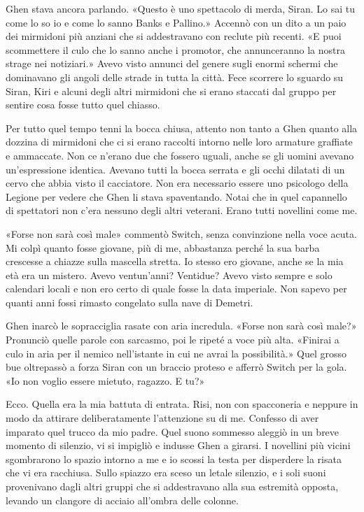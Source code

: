 Ghen stava ancora parlando. «Questo è uno spettacolo di merda, Siran. Lo
sai tu come lo so io e come lo sanno Banks e Pallino.» Accennò con un
dito a un paio dei mirmidoni più anziani che si addestravano con reclute
più recenti. «E puoi scommettere il culo che lo sanno anche i promotor,
che annunceranno la nostra strage nei notiziari.» Avevo visto annunci
del genere sugli enormi schermi che dominavano gli angoli delle strade
in tutta la città. Fece scorrere lo sguardo su Siran, Kiri e alcuni
degli altri mirmidoni che si erano staccati dal gruppo per sentire cosa
fosse tutto quel chiasso.

Per tutto quel tempo tenni la bocca chiusa, attento non tanto a Ghen
quanto alla dozzina di mirmidoni che ci si erano raccolti intorno nelle
loro armature graffiate e ammaccate. Non ce n'erano due che fossero
uguali, anche se gli uomini avevano un'espressione identica. Avevano
tutti la bocca serrata e gli occhi dilatati di un cervo che abbia visto
il cacciatore. Non era necessario essere uno psicologo della Legione per
vedere che Ghen li stava spaventando. Notai che in quel capannello di
spettatori non c'era nessuno degli altri veterani. Erano tutti novellini
come me.

«Forse non sarà così male» commentò Switch, senza convinzione nella voce
acuta. Mi colpì quanto fosse giovane, più di me, abbastanza perché la
sua barba crescesse a chiazze sulla mascella stretta. Io stesso ero
giovane, anche se la mia età era un mistero. Avevo ventun'anni?
Ventidue? Avevo visto sempre e solo calendari locali e non ero certo di
quale fosse la data imperiale. Non sapevo per quanti anni fossi rimasto
congelato sulla nave di Demetri.

Ghen inarcò le sopracciglia rasate con aria incredula. «Forse non sarà
così male?» Pronunciò quelle parole con sarcasmo, poi le ripeté a voce
più alta. «Finirai a culo in aria per il nemico nell'istante in cui ne
avrai la possibilità.» Quel grosso bue oltrepassò a forza Siran con un
braccio proteso e afferrò Switch per la gola. «Io non voglio essere
mietuto, ragazzo. E tu?»

Ecco. Quella era la mia battuta di entrata. Risi, non con spacconeria e
neppure in modo da attirare deliberatamente l'attenzione su di me.
Confesso di aver imparato quel trucco da mio padre. Quel suono sommesso
aleggiò in un breve momento di silenzio, vi si impigliò e indusse Ghen a
girarsi. I novellini più vicini sgombrarono lo spazio intorno a me e io
scossi la testa per disperdere la risata che vi era racchiusa. Sullo
spiazzo era sceso un letale silenzio, e i soli suoni provenivano dagli
altri gruppi che si addestravano alla sua estremità opposta, levando un
clangore di acciaio all'ombra delle colonne.

